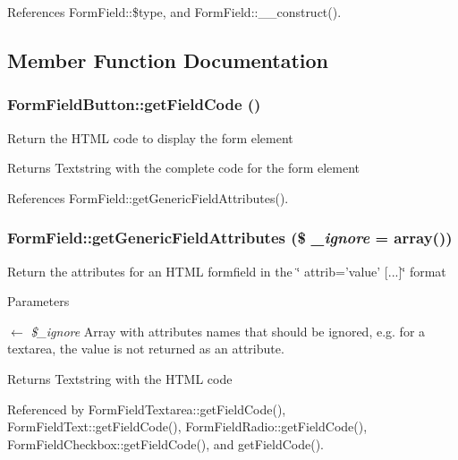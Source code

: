 References FormField::\$type, and FormField::\_\-\_\-construct().



\subsection{Member Function Documentation}
\subsubsection[{getFieldCode}]{\setlength{\rightskip}{0pt plus 5cm}FormFieldButton::getFieldCode ()}\label{classFormFieldButton_a792223807cd33f982ec6a5869120baab}
Return the HTML code to display the form element

\begin{DoxyReturn}{Returns}
Textstring with the complete code for the form element 
\end{DoxyReturn}


References FormField::getGenericFieldAttributes().

\subsubsection[{getGenericFieldAttributes}]{\setlength{\rightskip}{0pt plus 5cm}FormField::getGenericFieldAttributes (\$ {\em \_\-ignore} = {\ttfamily array()})}\label{classFormField_a9f9d136ba8b4a793f22370aff43d592d}
Return the attributes for an HTML formfield in the \char`\"{} attrib='value' \mbox{[}...\mbox{]}\char`\"{} format


\begin{DoxyParams}{Parameters}
\item[\mbox{$\leftarrow$} {\em \$\_\-ignore}]Array with attributes names that should be ignored, e.g. for a textarea, the value is not returned as an attribute. \end{DoxyParams}
\begin{DoxyReturn}{Returns}
Textstring with the HTML code 
\end{DoxyReturn}


Referenced by FormFieldTextarea::getFieldCode(), FormFieldText::getFieldCode(), FormFieldRadio::getFieldCode(), FormFieldCheckbox::getFieldCode(), and getFieldCode().

